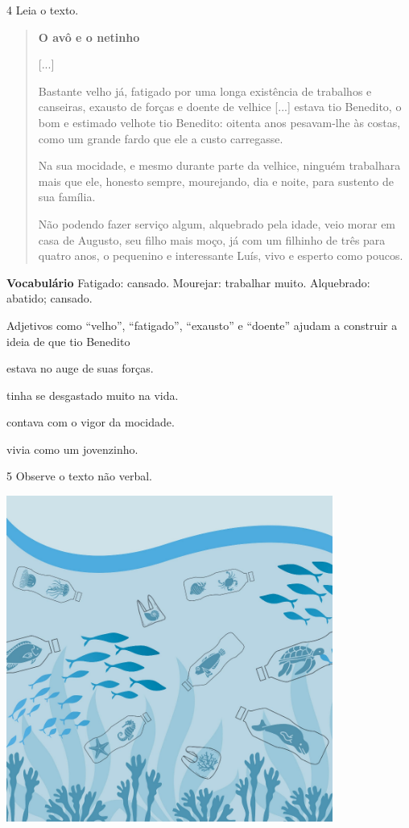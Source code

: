 \num{4} Leia o texto.

\begin{quote}
\textbf{O avô e o netinho}

{[}...{]}

Bastante velho já, fatigado por uma longa existência de trabalhos e
canseiras, exausto de forças e doente de velhice {[}...{]} estava tio Benedito, o bom e estimado velhote tio
Benedito: oitenta anos pesavam-lhe às costas, como um grande fardo que
ele a custo carregasse.

Na sua mocidade, e mesmo durante parte da velhice, ninguém trabalhara
mais que ele, honesto sempre, mourejando, dia e noite, para sustento de
sua família.

Não podendo fazer serviço algum, alquebrado pela idade, veio morar em
casa de Augusto, seu filho mais moço, já com um filhinho de três para
quatro anos, o pequenino e interessante Luís, vivo e esperto como
poucos.

\end{quote}

\textbf{Vocabulário}
Fatigado: cansado.
Mourejar: trabalhar muito.
Alquebrado: abatido; cansado.

Adjetivos como ``velho'', ``fatigado'', ``exausto'' e ``doente'' ajudam a construir a ideia de que tio Benedito

\begin{escolha}
\item estava no auge de suas forças.

\item tinha se desgastado muito na vida.

\item contava com o vigor da mocidade.

\item vivia como um jovenzinho.
\end{escolha}

\num{5} Observe o texto não verbal.

\includegraphics[width=4.21875in,height=4.21875in]{./media/simulados/image4.png}

